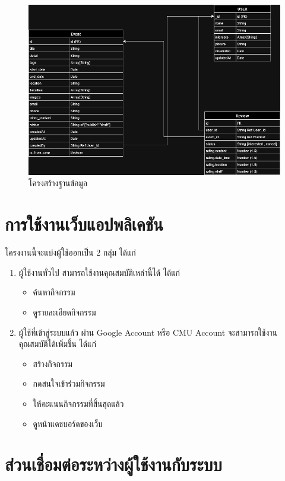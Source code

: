 \begin{figure}[H]
\begin{center}
\includegraphics[scale=0.4]{public/db-diagram.png}
\end{center}
\caption[โครงสร้างฐานข้อมูล]{โครงสร้างฐานข้อมูล}
\label{fig:db-schema}
\end{figure}
\section{การใช้งานเว็บแอปพลิเคชัน}
โครงงานนี้จะแบ่งผู้ใช้ออกเป็น 2 กลุ่ม ได้แก่
\begin{enumerate}
  \item ผู้ใช้งานทั่วไป สามารถใช้งานคุณสมบัติเหล่านี้ได้ ได้แก่
  \begin{itemize}
    \item ค้นหากิจกรรม
    \item ดูรายละเอียดกิจกรรม
  \end{itemize}
  \item ผู้ใช้ที่เข้าสู่ระบบแล้ว ผ่าน Google Account หรือ CMU Account จะสามารถใช้งานคุณสมบัติได้เพิ่มขึ้น ได้แก่
  \begin{itemize}
    \item สร้างกิจกรรม
    \item กดสนใจเข้าร่วมกิจกรรม
    \item ให้คะแนนกิจกรรมที่สิ้นสุดแล้ว
    \item ดูหน้าแดชบอร์ดของเว็บ
  \end{itemize}
\end{enumerate}
\section{ส่วนเชื่อมต่อระหว่างผู้ใช้งานกับระบบ}
